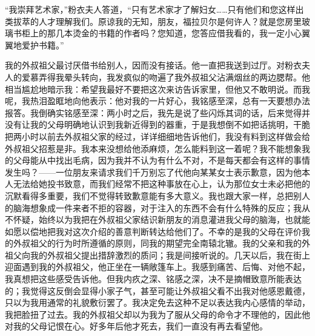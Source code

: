 \par “我崇拜艺术家，”粉衣夫人答道，“只有艺术家才了解妇女……只有他们和您这样出类拔萃的人才理解我们。原谅我的无知，朋友，福拉贝尔是何许人？就是您房里玻璃书柜上的那几本烫金的书籍的作者吗？您知道，您答应借我看的，我一定小心翼翼地爱护书籍。”
\par 我的外叔祖父最讨厌借书给别人，因而没有接话。他一直把我送到过厅。对粉衣夫人的爱慕弄得我晕头转向，我发疯似的吻遍了我外叔祖父沾满烟丝的两边腮帮。他相当尴尬地暗示我：希望我最好不要把这次来访告诉家里，但他又不敢明说。而我呢，我热泪盈眶地向他表示：他对我的一片好心，我铭感至深，总有一天要想办法报答。我倒确实铭感至深：两小时之后，我先是说了些闪烁其词的话，后来觉得并没有让我的父母明确地认识到我新近得到的器重，于是我想倒不如把话挑明，干脆把两小时以前去外叔祖父家的经过，详详细细地告诉他们，我没有料到这样做会给外叔祖父招惹是非。我本来没想给他添麻烦，怎么能料到这一着呢？我不能想象我的父母能从中找出毛病，因为我并不认为有什么不对，不是每天都会有这样的事情发生吗？——一位朋友来请求我们千万别忘了代他向某某女士表示歉意，因为他本人无法给她投书致意，而我们经常不把这种事放在心上，认为那位女士未必把他的沉默看得多重要，我们不觉得转致歉意能有多大意义。我也跟大家一样，总把别人的脑海想象成一件来者不拒的容器，对于注入的东西不会有什么特殊的反应；我从不怀疑，始终以为我把在外叔祖父家结识新朋友的消息灌进我父母的脑海，也就能如愿以偿地把我对这次介绍的善意判断转达给他们了。不幸的是我的父母在评价我的外叔祖父的行为时所遵循的原则，同我的期望完全南辕北辙。我的父亲和我的外祖父向我的外叔祖父提出措辞激烈的质问；我是间接听说的。几天以后，我在街上迎面遇到我的外叔祖父，他正坐在一辆敞篷车上。我感到痛苦、后悔、对他不起，我真想把这些感受告诉他。但我内疚之深、铭感之深，决不是摘帽致意所能表达的；我觉得这反倒会显得小家子气，甚至可能让外叔祖父看不出我对他感恩戴德，只以为我用通常的礼貌敷衍罢了。我决定免去这种不足以表达我内心感情的举动，我把脸扭了过去。我的外叔祖父却以为我为了服从父母的命令才不理他的，因此他对我的父母记恨在心。好多年后他才死去，我们一直没有再去看望他。
